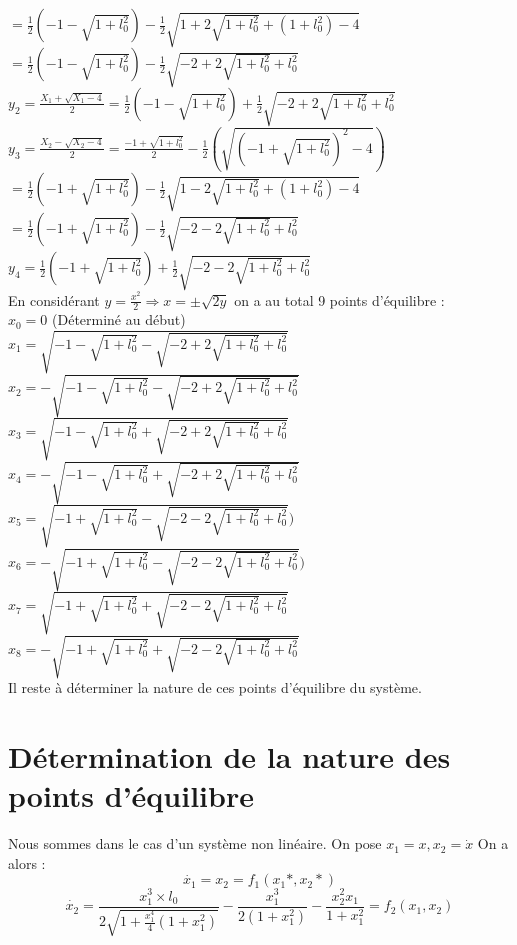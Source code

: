 \documentclass[10pt,a4paper]{article}
\begin{document}
$=\frac{1}{2}(-1-\sqrt{1+l_0^2})-\frac{1}{2}\sqrt{1+2\sqrt{1+l_0^2}+(1+l_0^2)-4}$\\
$=\frac{1}{2}(-1-\sqrt{1+l_0^2})-\frac{1}{2}\sqrt{-2+2\sqrt{1+l_0^2}+l_0^2}$\\
$y_2=\frac{X_1+\sqrt{X_1-4}}{2}=\frac{1}{2}(-1-\sqrt{1+l_0^2})+\frac{1}{2}\sqrt{-2+2\sqrt{1+l_0^2}+l_0^2}$\\
$y_3=\frac{X_2-\sqrt{X_2-4}}{2}=\frac{-1+\sqrt{1+l_0^2}}{2}-\frac{1}{2}(\sqrt{(-1+\sqrt{1+l_0^2})^2-4})$\\
$=\frac{1}{2}(-1+\sqrt{1+l_0^2})-\frac{1}{2}\sqrt{1-2\sqrt{1+l_0^2}+(1+l_0^2)-4}$\\
$=\frac{1}{2}(-1+\sqrt{1+l_0^2})-\frac{1}{2}\sqrt{-2-2\sqrt{1+l_0^2}+l_0^2}$\\
$y_4=\frac{1}{2}(-1+\sqrt{1+l_0^2})+\frac{1}{2}\sqrt{-2-2\sqrt{1+l_0^2}+l_0^2}$\\
En considérant $y=\frac{x^2}{2} \Longrightarrow x=\pm \sqrt{2y}$ on a au total 9 points d'équilibre :\\
$x_0=0$ (Déterminé au début)\\
$x_1=\sqrt{-1-\sqrt{1+l_0^2}-\sqrt{-2+2\sqrt{1+l_0^2}+l_0^2}}$\\
$x_2=-\sqrt{-1-\sqrt{1+l_0^2}-\sqrt{-2+2\sqrt{1+l_0^2}+l_0^2}}$\\
$x_3=\sqrt{-1-\sqrt{1+l_0^2}+\sqrt{-2+2\sqrt{1+l_0^2}+l_0^2}}$\\
$x_4=-\sqrt{-1-\sqrt{1+l_0^2}+\sqrt{-2+2\sqrt{1+l_0^2}+l_0^2}}$\\
$x_5=\sqrt{-1+\sqrt{1+l_0^2}-\sqrt{-2-2\sqrt{1+l_0^2}+l_0^2}})$\\
$x_6=-\sqrt{-1+\sqrt{1+l_0^2}-\sqrt{-2-2\sqrt{1+l_0^2}+l_0^2}})$\\
$x_7=\sqrt{-1+\sqrt{1+l_0^2}+\sqrt{-2-2\sqrt{1+l_0^2}+l_0^2}}$\\
$x_8=-\sqrt{-1+\sqrt{1+l_0^2}+\sqrt{-2-2\sqrt{1+l_0^2}+l_0^2}}$\\
Il reste à déterminer la nature de ces points d'équilibre du système.

\section{Détermination de la nature des points d'équilibre}
Nous sommes dans le cas d'un système non linéaire. 
On pose $x_1=x, x_2=\dot{x}$
On a alors :
\[\dot{x_1}=x_2=f_1(x_1*,x_2*)\]
\[\dot{x_2}=\frac{x_1^3\times l_0}{2\sqrt{1+\frac{x_1^4}{4}(1+x_1^2)}}-\frac{x_1^3}{2(1+x_1^2)}-\frac{x_2^2x_1}{1+x_1^2}=f_2(x_1,x_2)\]\\
\end{document}
